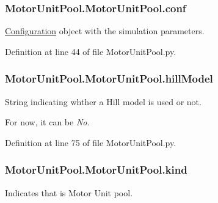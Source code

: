 \subsubsection[{\texorpdfstring{conf}{conf}}]{\setlength{\rightskip}{0pt plus 5cm}Motor\+Unit\+Pool.\+Motor\+Unit\+Pool.\+conf}\hypertarget{class_motor_unit_pool_1_1_motor_unit_pool_a3b2ee8f3e5500bfdc8fa731a5cb7d622}{}\label{class_motor_unit_pool_1_1_motor_unit_pool_a3b2ee8f3e5500bfdc8fa731a5cb7d622}


\hyperlink{namespace_configuration}{Configuration} object with the simulation parameters. 



Definition at line 44 of file Motor\+Unit\+Pool.\+py.

\subsubsection[{\texorpdfstring{hill\+Model}{hillModel}}]{\setlength{\rightskip}{0pt plus 5cm}Motor\+Unit\+Pool.\+Motor\+Unit\+Pool.\+hill\+Model}\hypertarget{class_motor_unit_pool_1_1_motor_unit_pool_a963061fdcfee8f9dc33e4d6f130ea59b}{}\label{class_motor_unit_pool_1_1_motor_unit_pool_a963061fdcfee8f9dc33e4d6f130ea59b}


String indicating whther a Hill model is used or not. 

For now, it can be {\itshape No}. 

Definition at line 75 of file Motor\+Unit\+Pool.\+py.

\subsubsection[{\texorpdfstring{kind}{kind}}]{\setlength{\rightskip}{0pt plus 5cm}Motor\+Unit\+Pool.\+Motor\+Unit\+Pool.\+kind}\hypertarget{class_motor_unit_pool_1_1_motor_unit_pool_aeb57d0463ad56a16b166d00dc6079b95}{}\label{class_motor_unit_pool_1_1_motor_unit_pool_aeb57d0463ad56a16b166d00dc6079b95}


Indicates that is Motor Unit pool. 



